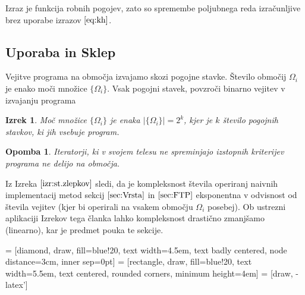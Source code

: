 \documentclass{article}
\newtheorem{izrek}{Izrek}[section]
\newtheorem{opomba}{Opomba}[section]
\begin{document}
    Izraz je funkcija robnih pogojev, zato so spremembe poljubnega reda izračunljive brez uporabe izrazov $\eqref{eq:kh}$.

\subsection{Uporaba in Sklep}

Vejitve programa na območja izvajamo skozi pogojne stavke. Število območij $\Omega_i$ je enako moči množice $\{\Omega_i\}$. Vsak pogojni stavek, povzroči binarno vejitev v izvajanju programa

\begin{izrek}\label{izr:st.zlepkov}
Moč množice $\{\Omega_i\}$ je enaka $\lvert\{\Omega_i \}\rvert=2^k$, kjer je $k$ število pogojnih stavkov, ki jih vsebuje program.
\end{izrek}
\begin{opomba}
Iteratorji, ki v svojem telesu ne spreminjajo izstopnih kriterijev programa ne delijo na območja.
\end{opomba}
Iz Izreka $\ref{izr:st.zlepkov}$ sledi, da je kompleksnost števila operiranj naivnih implementacij metod sekcij $\ref{sec:Vrsta}$ in $\ref{sec:FTP}$ eksponentna v odvisnost od števila vejitev (kjer bi operirali na vsakem območju $\Omega_i$ posebej). Ob ustrezni aplikaciji Izrekov tega članka lahko kompleksnost drastično zmanjšamo (linearno), kar je predmet pouka te sekcije.
\vspace{10px}

 = [diamond, draw, fill=blue!20, 
    text width=4.5em, text badly centered, node distance=3cm, inner sep=0pt]
 = [rectangle, draw, fill=blue!20, 
    text width=5.5em, text centered, rounded corners, minimum height=4em]
 = [draw, -latex']
\end{document}
